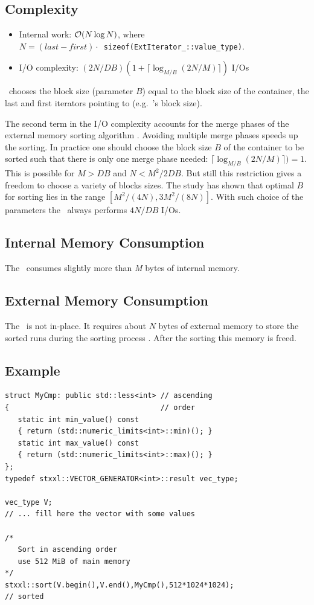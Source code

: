 \documentclass[twoside]{book}
\begin{document}
\subsection*{Complexity}
\label{sortcomplexity}
\begin{itemize}
\item Internal work: $\mathcal{O}\!\left( N \log N\right)$, where \\$N = (last -
first)\cdot$~\texttt{sizeof(ExtIterator\_::value\_type)}.
\item I/O complexity: $(2N/DB)(1 + \lceil {\log}_{M/B}(2N/M) \rceil)$ I/Os
\end{itemize}

\xsort\ chooses the block size (parameter $B$) equal to the block size
of the container, the last and first iterators pointing to
(e.g.\ \xvector's block size).

The second term in the I/O complexity accounts for the merge phases of
the external memory sorting algorithm \cite{DemSan03}. Avoiding
multiple merge phases  
speeds up the sorting. In practice one should choose the block size
$B$ of the container to be 
sorted such that there is only one merge phase needed: $\lceil
{\log}_{M/B}(2N/M) \rceil) = 1$. This is 
possible for $M > DB$ and $N < M^2/2DB$. But still this restriction
gives a freedom to choose a variety of blocks sizes. The study
\cite{DemSan03} has shown that optimal $B$ for sorting lies in the
range $[M^2/(4N),3M^2/(8N)]$. With such choice of the parameters the
\xsort\ always performs $4N/DB$ I/Os.

\subsection*{Internal Memory Consumption}
\label{sortimem}
The \xsort\ consumes slightly more than \emph{M} bytes of internal
memory. 

\subsection*{External Memory Consumption}
\label{sortemem}
The \xsort\ is not in-place. It requires about $N$ bytes of external
memory to store the sorted runs during the sorting process
\cite{DemSan03}. After the sorting this memory is freed.

\subsection*{Example}
\begin{lstlisting}
struct MyCmp: public std::less<int> // ascending
{                                   // order
   static int min_value() const  
   { return (std::numeric_limits<int>::min)(); }
   static int max_value() const  
   { return (std::numeric_limits<int>::max)(); }
};
typedef stxxl::VECTOR_GENERATOR<int>::result vec_type;

vec_type V;
// ... fill here the vector with some values

/*
   Sort in ascending order
   use 512 MiB of main memory
*/
stxxl::sort(V.begin(),V.end(),MyCmp(),512*1024*1024);
// sorted
\end{lstlisting}
\end{document}

